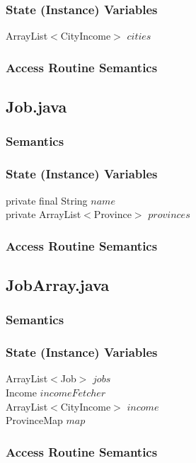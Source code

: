 \documentclass[12pt,fleqn]{article}
\begin{document}
\subsubsection*{State (Instance) Variables}
ArrayList$<$CityIncome$>$ $cities$
\subsubsection*{Access Routine Semantics}


\subsection*{Job.java}\label{pjob}

\subsubsection*{Semantics}
\subsubsection*{State (Instance) Variables}
	private final String $name$\\
	private ArrayList$<$Province$>$ $provinces$

\subsubsection*{Access Routine Semantics}


\subsection*{JobArray.java}\label{pjobarray}

\subsubsection*{Semantics}
\subsubsection*{State (Instance) Variables}
    	ArrayList$<$Job$>$ $jobs$\\
	Income $incomeFetcher$\\
	ArrayList$<$CityIncome$>$ $income$\\
	ProvinceMap $map$
\subsubsection*{Access Routine Semantics}
\end{document}
